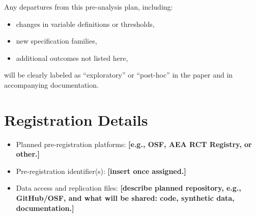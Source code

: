 \documentclass[12pt]{article}
\begin{document}
Any departures from this pre-analysis plan, including:
\begin{itemize}
    \item changes in variable definitions or thresholds,
    \item new specification families,
    \item additional outcomes not listed here,
\end{itemize}
will be clearly labeled as ``exploratory'' or ``post-hoc'' in the paper and in accompanying documentation.

\section{Registration Details}

\begin{itemize}
    \item Planned pre-registration platforms: \textbf{[e.g., OSF, AEA RCT Registry, or other.]}
    \item Pre-registration identifier(s): \textbf{[insert once assigned.]}
    \item Data access and replication files: \textbf{[describe planned repository, e.g., GitHub/OSF, and what will be shared: code, synthetic data, documentation.]}
\end{itemize}


\printbibliography[title={References}]
\end{document}
